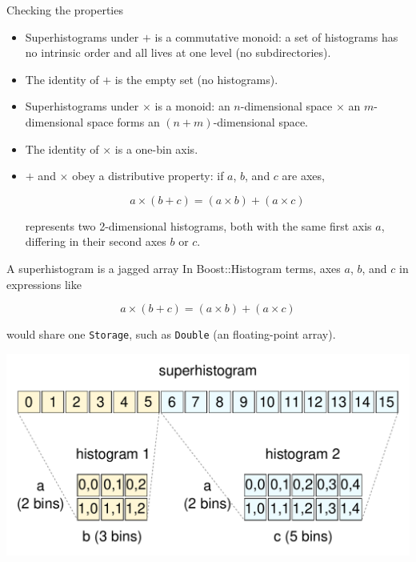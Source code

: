 \documentclass[aspectratio=169]{beamer}
\begin{document}
\begin{frame}{Checking the properties}
\vspace{0.5 cm}
\large

\begin{itemize}\setlength{\itemsep}{0.25 cm}
\item<1-> Superhistograms under $+$ is a commutative monoid: a set of histograms has no intrinsic order and all lives at one level (no subdirectories).
\item<1-> The identity of $+$ is the empty set (no histograms).
\item<2-> Superhistograms under $\times$ is a monoid: an $n$-dimensional space $\times$ an $m$-dimensional space forms an $(n + m)$-dimensional space.
\item<2-> The identity of $\times$ is a one-bin axis.
\item<3-> $+$ and $\times$ obey a distributive property: if $a$, $b$, and $c$ are axes,

\vspace{-0.25 cm}
\[ a \times (b + c) = (a \times b) + (a \times c) \]

represents two 2-dimensional histograms, both with the same first axis $a$, differing in their second axes $b$ or $c$.
\end{itemize}
\end{frame}

\begin{frame}{A superhistogram is a jagged array}
\vspace{0.25 cm}
\large
In Boost::Histogram terms, axes $a$, $b$, and $c$ in expressions like

\vspace{-0.2 cm}
\[ a \times (b + c) = (a \times b) + (a \times c) \]

\vspace{0.2 cm}
would share one \texttt{Storage}, such as \texttt{Double} (an floating-point array).

\begin{center}
\includegraphics[width=0.8\linewidth]{sharing-storage.pdf}
\end{center}
\end{frame}
\end{document}
